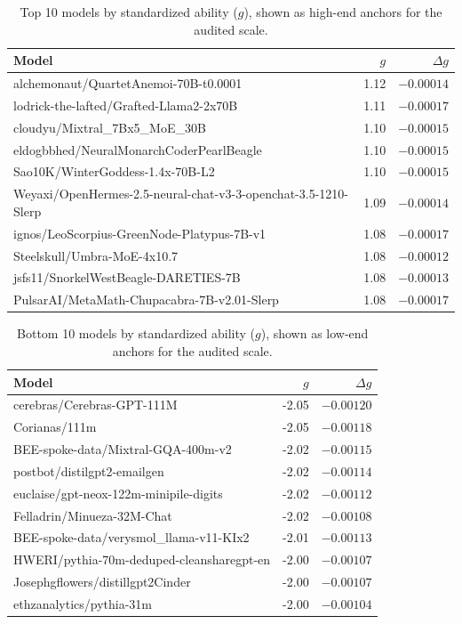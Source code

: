 \documentclass[11pt]{article}
\begin{document}
\begin{table}[H]
\centering
\scriptsize
\begin{tabular}{@{}p{}rr@{}}
\toprule
Model & $g$ & $\Delta g$ \\
\midrule
alchemonaut/QuartetAnemoi-70B-t0.0001 & 1.12 & $-0.00014$ \\
lodrick-the-lafted/Grafted-Llama2-2x70B & 1.11 & $-0.00017$ \\
cloudyu/Mixtral\_7Bx5\_MoE\_30B & 1.10 & $-0.00015$ \\
eldogbbhed/NeuralMonarchCoderPearlBeagle & 1.10 & $-0.00015$ \\
Sao10K/WinterGoddess-1.4x-70B-L2 & 1.10 & $-0.00015$ \\
Weyaxi/OpenHermes-2.5-neural-chat-v3-3-openchat-3.5-1210-Slerp & 1.09 & $-0.00014$ \\
ignos/LeoScorpius-GreenNode-Platypus-7B-v1 & 1.08 & $-0.00017$ \\
Steelskull/Umbra-MoE-4x10.7 & 1.08 & $-0.00012$ \\
jsfs11/SnorkelWestBeagle-DARETIES-7B & 1.08 & $-0.00013$ \\
PulsarAI/MetaMath-Chupacabra-7B-v2.01-Slerp & 1.08 & $-0.00017$ \\
\bottomrule
\end{tabular}
\caption{Top 10 models by standardized ability ($g$), shown as high-end anchors for the audited scale.}
\label{tab:top10g}
\end{table}

\begin{table}[H]
\centering
\scriptsize
\begin{tabular}{@{}p{}rr@{}}
\toprule
Model & $g$ & $\Delta g$ \\
\midrule
cerebras/Cerebras-GPT-111M & -2.05 & $-0.00120$ \\
Corianas/111m & -2.05 & $-0.00118$ \\
BEE-spoke-data/Mixtral-GQA-400m-v2 & -2.02 & $-0.00115$ \\
postbot/distilgpt2-emailgen & -2.02 & $-0.00114$ \\
euclaise/gpt-neox-122m-minipile-digits & -2.02 & $-0.00112$ \\
Felladrin/Minueza-32M-Chat & -2.02 & $-0.00108$ \\
BEE-spoke-data/verysmol\_llama-v11-KIx2 & -2.01 & $-0.00113$ \\
HWERI/pythia-70m-deduped-cleansharegpt-en & -2.00 & $-0.00107$ \\
Josephgflowers/distillgpt2Cinder & -2.00 & $-0.00107$ \\
ethzanalytics/pythia-31m & -2.00 & $-0.00104$ \\
\bottomrule
\end{tabular}
\caption{Bottom 10 models by standardized ability ($g$), shown as low-end anchors for the audited scale.}
\label{tab:bottom10g}
\end{table}
\end{document}
